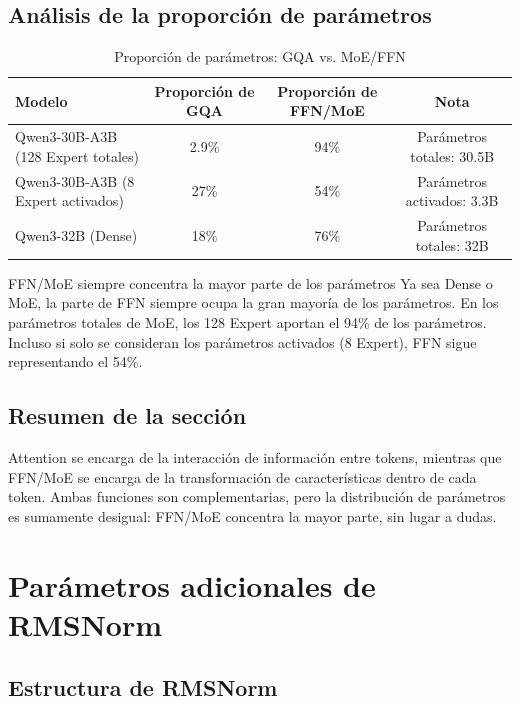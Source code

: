 \documentclass[a4paper]{article}
\begin{document}
\subsection{Análisis de la proporción de parámetros}

\begin{table}[H]
\centering
\caption{Proporción de parámetros: GQA vs. MoE/FFN}
\begin{tabular}{lccc}
\toprule
\textbf{Modelo} & \textbf{Proporción de GQA} & \textbf{Proporción de FFN/MoE} & \textbf{Nota} \\
\midrule
Qwen3-30B-A3B (128 Expert totales) & 2.9\% & 94\% & Parámetros totales: 30.5B \\
Qwen3-30B-A3B (8 Expert activados) & 27\% & 54\% & Parámetros activados: 3.3B \\
Qwen3-32B (Dense) & 18\% & 76\% & Parámetros totales: 32B \\
\bottomrule
\end{tabular}
\end{table}

\begin{knowledgebox}{FFN/MoE siempre concentra la mayor parte de los parámetros}
Ya sea Dense o MoE, la parte de FFN siempre ocupa la gran mayoría de los parámetros. En los parámetros totales de MoE, los 128 Expert aportan el 94\% de los parámetros. Incluso si solo se consideran los parámetros activados (8 Expert), FFN sigue representando el 54\%.
\end{knowledgebox}

\subsection{Resumen de la sección}

Attention se encarga de la interacción de información entre tokens, mientras que FFN/MoE se encarga de la transformación de características dentro de cada token. Ambas funciones son complementarias, pero la distribución de parámetros es sumamente desigual: FFN/MoE concentra la mayor parte, sin lugar a dudas.
\section{Parámetros adicionales de RMSNorm}

\subsection{Estructura de RMSNorm}
\end{document}
